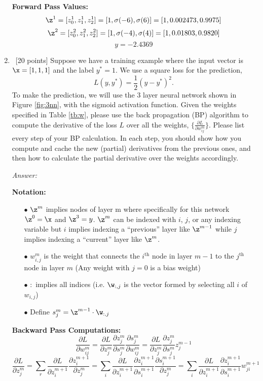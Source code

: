 \documentclass[12pt, fullpage,letterpaper]{article}
\begin{document}
\begin{enumerate}
	\textbf{Forward Pass Values:}
	\[
		\z^1 = [z_0^1, z_1^1, z_2^1] = [1, \sigma(-6), \sigma(6)] = [1, 0.002473, 0.9975]
	\]
	\[
		\z^2 = [z_0^2, z_1^2, z_2^2] = [1, \sigma(-4), \sigma(4)] = [1, 0.01803, 0.9820]
	\]
	\[
		y = -2.4369 
	\]
	
	\item~[20 points] Suppose we have a training example  where the input vector is $\x = [1,1,1]$ and the label $y^* = 1$. We use a square loss for the prediction, 
	\[
	L(y, y^*) = \frac{1}{2}(y-y^*)^2.
	\]
	To make the prediction, we will use the 3 layer neural network shown in Figure \ref{fig:3nn}, with the sigmoid activation function. Given the weights specified in Table \ref{tb:w}, please use the back propagation (BP) algorithm to compute the derivative of the loss $L$ over all the weights, $\{\frac{\partial L}{\partial w^{m}_{ij}}\}$. Please list every step of your BP calculation. In each step, you should show how you compute and cache the new (partial) derivatives from the previous ones, and then how to calculate the partial derivative over the weights accordingly.  

	\textit{Answer:}

	\textbf{Notation:}
	\begin{enumerate}
	\item[$\bullet$] $\z^m$ implies nodes of layer m where specifically for this network $\z^0 = \x$ and $\z^3 = y$.  
	$\z^m$ can be indexed with $i$, $j$, or any indexing variable but $i$ implies indexing a ``previous'' layer like $\z^{m-1}$ while $j$ implies indexing a ``current'' layer like $\z^{m}$.

	\item[$\bullet$] $w^{m}_{i,j}$ is the weight that connects the $i^{\text{th}}$ node in layer $m-1$ to the $j^{\text{th}}$ node in layer $m$ (Any weight with $j=0$ is a bias weight)

	\item[$\bullet$] $:$ implies all indices (i.e. $\w_{:,j}$ is the vector formed by selecting all $i$ of $w_{i,j}$)

	\item[$\bullet$] Define $s_j^m = \z^{m-1} \cdot \w_{:,j}$

	\end{enumerate}

	\textbf{Backward Pass Computations:}
	\[
		\frac{\partial L}{\partial w^{m}_{ij}} = \frac{\partial L}{\partial z^{m}_{j}} \frac{\partial z^{m}_{j}}{\partial s_j^m} \frac{\partial s_j^m}{\partial w^{m}_{ij}} = \frac{\partial L}{\partial z^{m}_{j}} \frac{\partial z^{m}_{j}}{\partial s_j^m} z^{m-1}_{j} 
	\]
	\[
		\frac{\partial L}{\partial z^{m}_{j}} = \sum_r{\frac{\partial L}{\partial z^{m+1}_{i}} \frac{\partial z^{m+1}_{i}}{\partial z^{m}_{j}}} = \sum_i{\frac{\partial L}{\partial z^{m+1}_{i}} \frac{\partial z^{m+1}_{i}}{\partial s^{m+1}_{i}} \frac{\partial s^{m+1}_{i}}{\partial z^{m}_{j}}} = \sum_i{\frac{\partial L}{\partial z^{m+1}_{i}} \frac{\partial z^{m+1}_{i}}{\partial s^{m+1}_{i}} w^{m+1}_{ji}}
	\]


\end{enumerate}
\end{document}
